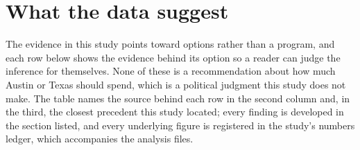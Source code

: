 \section{What the data suggest}
\label{sec:lessons}

The evidence in this study points toward options rather than a program, and
each row below shows the evidence behind its option so a reader can judge the
inference for themselves. None of these is a recommendation about how much
Austin or Texas should spend, which is a political judgment this study does not
make. The table names the source behind each row in the second column and, in
the third, the closest precedent this study located; every finding is developed
in the section listed, and every underlying figure is registered in the
study's numbers ledger, which accompanies the analysis files.

